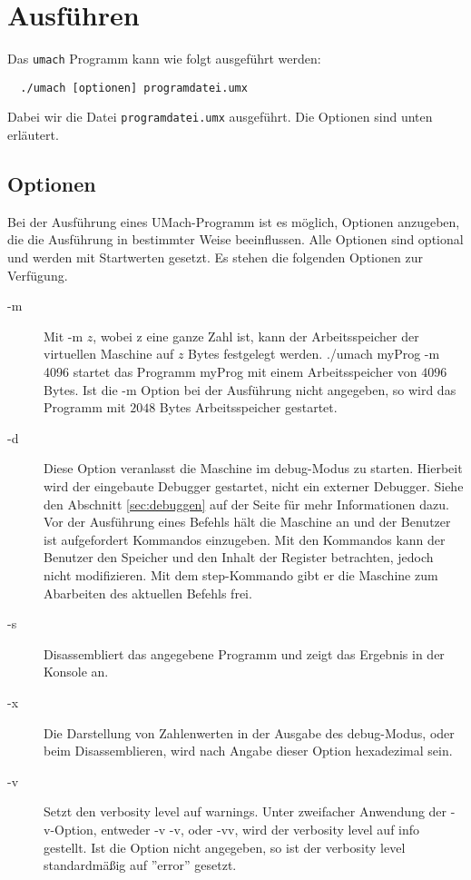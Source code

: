 \section{Ausführen}

Das \texttt{umach} Programm kann wie folgt ausgeführt werden:
\begin{lstlisting}
  ./umach [optionen] programdatei.umx
\end{lstlisting}

Dabei wir die Datei \texttt{programdatei.umx} ausgeführt. Die Optionen sind
unten erläutert.


\subsection{Optionen}
Bei der Ausführung eines UMach-Programm ist es möglich, Optionen anzugeben, die
die Ausführung in bestimmter Weise beeinflussen. Alle Optionen sind optional und
werden mit Startwerten gesetzt. Es stehen die folgenden Optionen zur Verfügung.
\begin{description}
\item[-m]
Mit \glqq{}-m $z$\grqq{}, wobei \glqq{}z\grqq{} eine ganze Zahl ist, kann der
Arbeitsspeicher der virtuellen Maschine auf $z$ Bytes festgelegt werden.
\grqq{}./umach myProg -m 4096\grqq{} startet das Programm \glqq{}myProg\grqq{}
mit einem Arbeitsspeicher von $4096$ Bytes. Ist die \glqq{}-m\grqq{} Option bei
der Ausführung nicht angegeben, so wird das Programm mit $2048$ Bytes
Arbeitsspeicher gestartet.
\item[-d]
Diese Option veranlasst die Maschine im \glqq{}debug\grqq{}-Modus zu starten.
Hierbeit wird der eingebaute Debugger gestartet, nicht ein externer Debugger.
Siehe den Abschnitt \ref{sec:debuggen} auf der Seite \pageref{sec:debuggen} für
mehr Informationen dazu. Vor der Ausführung eines Befehls hält die Maschine an
und der Benutzer ist aufgefordert Kommandos einzugeben. Mit den Kommandos kann
der Benutzer den Speicher und den Inhalt der Register betrachten, jedoch nicht
modifizieren. Mit dem \glqq{}step\grqq{}-Kommando gibt er die Maschine zum
Abarbeiten des aktuellen Befehls frei.
\item[-s]
Disassembliert das angegebene Programm und zeigt das Ergebnis in der Konsole an.
\item[-x]
Die Darstellung von Zahlenwerten in der Ausgabe des \glqq{}debug\grqq{}-Modus,
oder beim Disassemblieren, wird nach Angabe dieser Option hexadezimal sein.
\item[-v]
Setzt den \glqq{}verbosity level\grqq{} auf \glqq{}warnings\grqq{}. Unter
zweifacher Anwendung der \glqq{}-v\grqq{}-Option, entweder \glqq{}-v -v\grqq{},
oder \glqq{}-vv\grqq{}, wird der \glqq{}verbosity level\grqq{} auf
\glqq{}info\grqq{} gestellt. Ist die Option nicht angegeben, so ist der
\glqq{}verbosity level\grqq{} standardmäßig auf ''error'' gesetzt.


\end{description}

